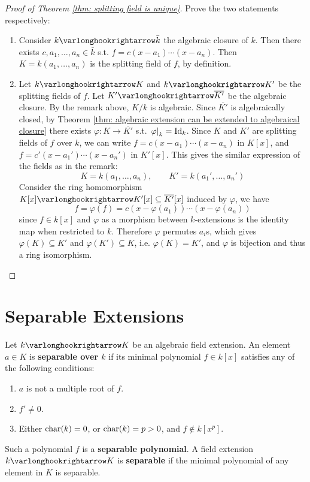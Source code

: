 \begin{proof}[Proof of Theorem \ref{thm: splitting field is unique}]
    Prove the two statements respectively:
    \begin{enumerate}[label=\arabic*)]
        \item Consider $k \ext \bar{k}$ the algebraic closure of $k$. Then there exists $c, a_1, \dots, a_n \in \bar{k}$ s.t. $f = c(x - a_1) \cdots (x - a_n)$. Then $K = k(a_1, \dots, a_n)$ is the splitting field of $f$, by definition.
        \item Let $k \ext K$ and $k \ext K'$ be the splitting fields of $f$. Let $K' \ext \overline{K'}$ be the algebraic closure. By the remark above, $K/k$ is algebraic. Since $\overline{K'}$ is algebraically closed, by Theorem \ref{thm: algebraic extension can be extended to algebraical closure} there exists $\varphi: K \to \overline{K'}$ s.t. $\left.\varphi\right|_{k} = \mathrm{Id}_k$. Since $K$ and $K'$ are splitting fields of $f$ over $k$, we can write $f = c(x - a_1) \cdots (x - a_n)$ in $K[x]$, and $f = c'(x - a_1') \cdots (x - a_n')$ in $K'[x]$. This gives the similar expression of the fields as in the remark: 
        \[
            K = k(a_1, \dots, a_n), \qquad K' = k(a_1', \dots, a_n')
        \]
        Consider the ring homomorphism $K[x] \ext K'[x] \subseteq \overline{K'}[x]$ induced by $\varphi$, we have
        \[
            f = \varphi(f) = c(x - \varphi(a_1)) \cdots (x - \varphi(a_n))
        \]
        since $f \in k[x]$ and $\varphi$ as a morphism between $k$-extensions is the identity map when restricted to $k$. Therefore $\varphi$ permutes $a_i$s, which gives $\varphi(K) \subseteq K'$ and $\varphi(K') \subseteq K$, i.e. $\varphi(K) = K'$, and $\varphi$ is bijection and thus a ring isomorphism.
    \end{enumerate}
\end{proof}

\section{Separable Extensions}

\begin{definition}\label{def: separable extension}
    Let $k \ext K$ be an algebraic field extension. An element $a \in K$ is \textbf{separable over $k$} if its minimal polynomial $f \in k[x]$ satisfies any of the following conditions:
    \begin{enumerate}[label=\arabic*)]
        \item $a$ is not a multiple root of $f$.
        \item $f' \neq 0$.
        \item Either $\mathrm{char}(k) = 0$, or $\mathrm{char}(k) = p > 0$, and $f \notin k[x^p]$.
    \end{enumerate}
    Such a polynomial $f$ is a \textbf{separable polynomial}. A field extension $k \ext K$ is \textbf{separable} if the minimal polynomial of any element in $K$ is separable. 
\end{definition}


